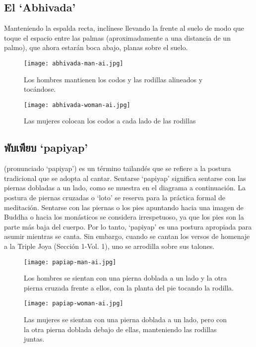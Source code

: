 \subsection{El ‘Abhivada'}
Manteniendo la espalda recta, inclínese llevando la frente al suelo de modo que toque el espacio entre las palmas (aproximadamente a una distancia de un palmo), que ahora estarán boca abajo, planas sobre el suelo.
\begin{figure}[h]
	\centering
	\begin{minipage}{0.40\textwidth}
		\centering
		\texttt{[image: abhivada-man-ai.jpg]}
		\caption{Los hombres mantienen los codos y las rodillas alineados y tocándose.}
	\end{minipage}
	\hfill
	\begin{minipage}{0.40\textwidth}
		\centering
		\texttt{[image: abhivada-woman-ai.jpg]}
		\caption{Las mujeres colocan los codos a cada lado de las rodillas}
	\end{minipage}
\end{figure}

\subsection{\thaiFont พับเพียบ ‘papiyap'}

 \normalfont(pronunciado ‘papiyap') es un término tailandés que se refiere a la postura tradicional que se adopta al cantar. Sentarse ‘papiyap' significa sentarse con las piernas dobladas a un lado, como se muestra en el diagrama a continuación. La postura de piernas cruzadas o ‘loto' se reserva para la práctica formal de meditación. Sentarse con las piernas o los pies apuntando hacia una imagen de Buddha o hacia los monásticos se considera irrespetuoso, ya que los pies son la parte más baja del cuerpo. Por lo tanto, ‘papiyap' es una postura apropiada para asumir mientras se canta. Sin embargo, cuando se cantan los versos de homenaje a la Triple Joya (Sección 1-Vol. 1), uno se arrodilla sobre sus talones. 
\enlargethispage{3\baselineskip}
\begin{figure}[h]
	\centering
	
	\begin{minipage}{0.40\textwidth}
		\centering
		\texttt{[image: papiap-man-ai.jpg]}
		\caption{Los hombres se sientan con una pierna doblada a un lado y la otra pierna cruzada frente a ellos, con la planta del pie tocando la rodilla.}
	\end{minipage}
	\hfill
	\begin{minipage}{0.40\textwidth}
		\centering
		\texttt{[image: papiap-woman-ai.jpg]}
		\caption{Las mujeres se sientan con una pierna doblada a un lado, pero con la otra pierna doblada debajo de ellas, manteniendo las rodillas juntas.}
	\end{minipage}
	
\end{figure}

